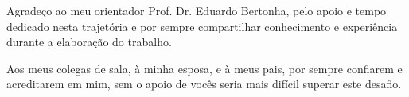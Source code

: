
\begin{agradecimentos}%

Agradeço ao meu orientador Prof. Dr. Eduardo Bertonha, pelo apoio e tempo 
dedicado nesta trajetória e por sempre compartilhar conhecimento e 
experiência durante a elaboração do trabalho.

Aos meus colegas de sala, à minha esposa, e à meus pais, por sempre 
confiarem e acreditarem em mim, sem o apoio de vocês seria mais difícil 
superar este desafio. 

\end{agradecimentos}

